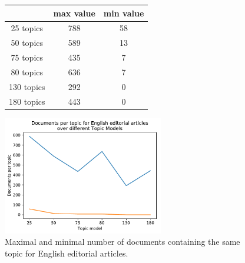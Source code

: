 \begin{figure}[h]
	\begin{minipage}{0.5\textwidth}
		\centering
		\begin{tabular}[t]{c|cc}
			&max value & min value\\
			\hline
			25 topics&788&58\\
			50 topics&589&13\\
			75 topics&435&7\\
			80 topics&636&7\\
			130 topics &292&0\\
			180 topics&	443&0\\
		\end{tabular}
	\end{minipage}
	\begin{minipage}{0.5\textwidth}
		\centering
		\includegraphics[width=7cm]{gfx/Eval_IC/English_Editorial_Doc_per_topic.pdf}
	\end{minipage}
	\caption[]{Maximal and minimal number of documents containing the same topic for English editorial articles.}
	\label{eval:amount doc_per_topic_eng}
\end{figure}

